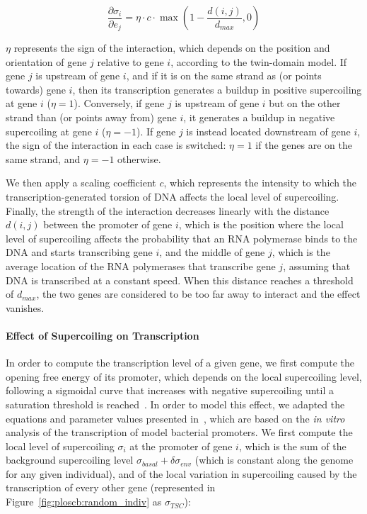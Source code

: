 \begin{equation}
  \frac{\partial\sigma_{i}}{\partial e_j} = \eta \cdot c \cdot \max(1-\frac{d(i, j)}{d_{max}}, 0)
  \label{eq:dsigmade}
\end{equation}

$\eta$ represents the sign of the interaction, which depends on the position and orientation of gene $j$ relative to gene $i$, according to the twin-domain model.
If gene $j$ is upstream of gene $i$, and if it is on the same strand as (or points towards) gene $i$, then its transcription generates a buildup in positive supercoiling at gene $i$ ($\eta = 1$).
Conversely, if gene $j$ is upstream of gene $i$ but on the other strand than (or points away from) gene $i$, it generates a buildup in negative supercoiling at gene $i$ ($\eta = -1$).
If gene $j$ is instead located downstream of gene $i$, the sign of the interaction in each case is switched: $\eta = 1$ if the genes are on the same strand, and $\eta = -1$ otherwise.

We then apply a scaling coefficient $c$, which represents the intensity to which the transcription-generated torsion of DNA affects the local level of supercoiling.
Finally, the strength of the interaction decreases linearly with the distance $d(i, j)$ between the promoter of gene $i$, which is the position where the local level of supercoiling affects the probability that an RNA polymerase binds to the DNA and starts transcribing gene $i$, and the middle of gene $j$, which is the average location of the RNA polymerases that transcribe gene $j$, assuming that DNA is transcribed at a constant speed.
When this distance reaches a threshold of $d_{max}$, the two genes are considered to be too far away to interact and the effect vanishes.

\paragraph{Effect of Supercoiling on Transcription}
In order to compute the transcription level of a given gene, we first compute the opening free energy of its promoter, which depends on the local supercoiling level, following a sigmoidal curve that increases with negative supercoiling until a saturation threshold is reached~\citep{forquet2021}.
In order to model this effect, we adapted the equations and parameter values presented in~\cite{elhoudaigui2019}, which are based on the \emph{in vitro} analysis of the transcription of model bacterial promoters.
We first compute the local level of supercoiling $\sigma_i$ at the promoter of gene $i$, which is the sum of the background supercoiling level $\sigma_{basal} + \delta\sigma_{env}$ (which is constant along the genome for any given individual), and of the local variation in supercoiling caused by the transcription of every other gene (represented in Figure~\ref{fig:ploscb:random_indiv} as $\sigma_{TSC}$):

